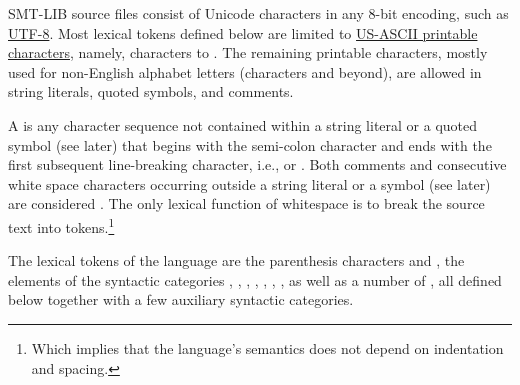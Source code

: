 SMT-LIB source files consist of Unicode characters in any 8-bit encoding, 
such as \href{http://en.wikipedia.org/wiki/UTF-8}{UTF-8}.
Most lexical tokens defined below are limited to \href{http://en.wikipedia.org/wiki/ASCII#ASCII_printable_characters}{US-ASCII printable characters},
namely, characters  to .
The remaining printable characters,
mostly used for non-English alphabet letters
(characters  and beyond), %
are allowed in string literals, quoted symbols, and comments.

%
A  is any character sequence 
not contained within a string literal or a quoted symbol (see later)
that begins with the semi-colon character \ter{;}
and ends with the first subsequent line-breaking character,
i.e.,  or .
Both comments and consecutive white space characters occurring outside
a string literal or a symbol (see later) are considered .
The only lexical function of whitespace is to break the source text into tokens.\footnote{%
Which implies that the language's semantics does not depend on indentation and spacing.
}

The lexical tokens of the language are
the parenthesis characters \ter{(} and \ter{)},
the elements of the syntactic categories 
,
,
,
,
,
,
,
as well as a number of ,
all defined below together with a few auxiliary syntactic categories.



